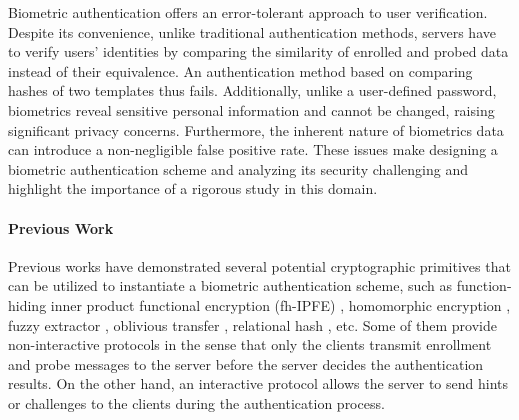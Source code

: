 


Biometric authentication offers an error-tolerant approach to user verification. Despite its convenience, unlike traditional authentication methods, servers have to verify users' identities by comparing the similarity of enrolled and probed data instead of their equivalence. An authentication method based on comparing hashes of two templates thus fails. Additionally, unlike a user-defined password, biometrics reveal sensitive personal information and cannot be changed, raising significant privacy concerns. Furthermore, the inherent nature of biometrics data can introduce a non-negligible false positive rate. These issues make designing a biometric authentication scheme and analyzing its security challenging and highlight the importance of a rigorous study in this domain.

\paragraph{Previous Work}
Previous works have demonstrated several potential cryptographic primitives that can be utilized to instantiate a biometric authentication scheme, such as function-hiding inner product functional encryption (fh-IPFE) \cite{cryptoeprint:2016/440, cryptoeprint:2018/1214, 10.1007/978-3-030-90567-5_33, 10.1145/3488932.3497754, cryptoeprint:2023/481}, homomorphic encryption \cite{10.1007/978-3-642-40588-4_5, pradel2021privacypreservingbiometricmatchingusing}, fuzzy extractor \cite{10.1145/1030083.1030096, 7980010}, oblivious transfer \cite{cryptoeprint:2012/586}, relational hash \cite{cryptoeprint:2014/394}, etc. Some of them provide non-interactive protocols in the sense that only the clients transmit enrollment and probe messages to the server before the server decides the authentication results. On the other hand, an interactive protocol allows the server to send hints or challenges to the clients during the authentication process.

